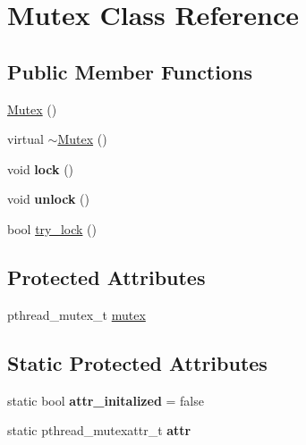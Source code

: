 \hypertarget{classMutex}{
\section{Mutex Class Reference}
\label{classMutex}
}
\subsection*{Public Member Functions}
\begin{DoxyCompactItemize}
\item 
\hyperlink{classMutex_a593423d868daf926c7b0d63a833ae29a}{Mutex} ()
\item 
virtual \hyperlink{classMutex_ac9e9182407f5f74892318607888e9be4}{$\sim$Mutex} ()
\item 
\hypertarget{classMutex_ad91be808bf0a60a16f10b897ec246d3a}{
void {\bfseries lock} ()}
\label{classMutex_ad91be808bf0a60a16f10b897ec246d3a}

\item 
\hypertarget{classMutex_a546a5b797ba29959357586aa2b3740a8}{
void {\bfseries unlock} ()}
\label{classMutex_a546a5b797ba29959357586aa2b3740a8}

\item 
bool \hyperlink{classMutex_a85bdf2b7c3d9ce789c61f8bc2a127c8a}{try\_\-lock} ()
\end{DoxyCompactItemize}
\subsection*{Protected Attributes}
\begin{DoxyCompactItemize}
\item 
pthread\_\-mutex\_\-t \hyperlink{classMutex_a8feb0b01916c1feedd1f0c0dcd74081b}{mutex}
\end{DoxyCompactItemize}
\subsection*{Static Protected Attributes}
\begin{DoxyCompactItemize}
\item 
\hypertarget{classMutex_ad7ee7f8bf85bcdc0cd99f7fb82cd9f83}{
static bool {\bfseries attr\_\-initalized} = false}
\label{classMutex_ad7ee7f8bf85bcdc0cd99f7fb82cd9f83}

\item 
\hypertarget{classMutex_a7c27b9401231941ebf4cce6cfc81192c}{
static pthread\_\-mutexattr\_\-t {\bfseries attr}}
\label{classMutex_a7c27b9401231941ebf4cce6cfc81192c}

\end{DoxyCompactItemize}



